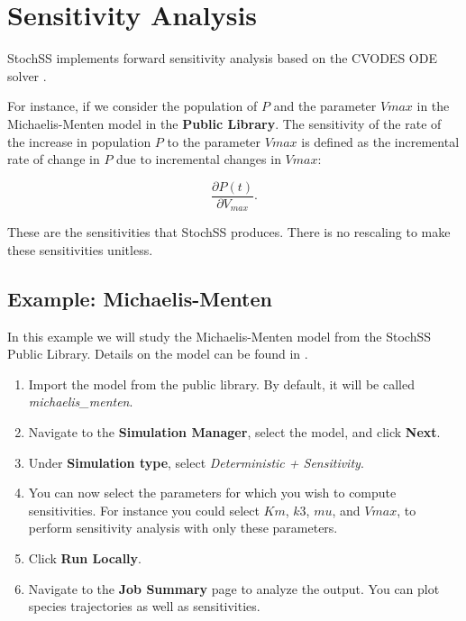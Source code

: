 \chapter{Sensitivity Analysis}

StochSS implements forward sensitivity analysis based on the CVODES ODE solver \cite{sundials}.

For instance, if we consider the population of $P$ and the parameter $Vmax$ in the Michaelis-Menten model in the \textbf{Public Library}. The sensitivity of the rate of the increase in population $P$ to the parameter $Vmax$ is defined as the incremental rate of change in $P$ due to incremental changes in $Vmax$:

\begin{equation}
\frac{\partial P(t)}{\partial V_{max}}.
\end{equation}

These are the sensitivities that StochSS produces. There is no rescaling to make these sensitivities unitless.

\section{Example: Michaelis-Menten}

In this example we will study the Michaelis-Menten model from the StochSS Public Library. Details on the model can be found in \cite{wiki-michaelis-menten}.
\begin{enumerate}
\item Import the model from the public library. By default, it will be called \textit{michaelis\_menten}.
\item Navigate to the \textbf{Simulation Manager}, select the model, and click \textbf{Next}.
\item Under \textbf{Simulation type}, select \textit{Deterministic + Sensitivity}.
\item You can now select the parameters for which you wish to compute sensitivities. For instance you could select $Km$, $k3$, $mu$, and $Vmax$, to perform sensitivity analysis with only these parameters.
\item Click \textbf{Run Locally}. 
\item Navigate to the \textbf{Job Summary} page to analyze the output. You can plot species trajectories as well as sensitivities.
\end{enumerate}


